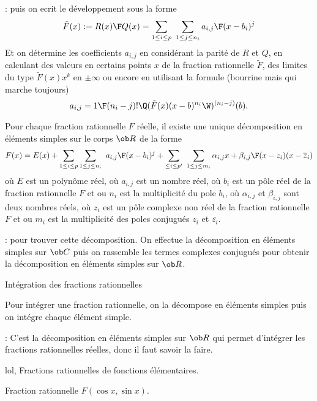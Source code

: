 \Remarque : puis on ecrit le développement sous la forme 
$$
\tilde F(x):={R(x)\F Q(x)}=\sum_{1\le i\le p}\ \sum_{1\le j\le n_i}{a_{i,j}\F (x-b_i)^j}
$$
Et on détermine les coefficients $a_{i,j}$ en considérant la parité de $R$ et $Q$, en calculant des valeurs en certains points $x$ de la fraction rationnelle $\tilde F$, des limites du type $\tilde F(x)x^k$ en $\pm\infty$ ou encore en utilisant la formule (bourrine mais qui marche toujours) 
$$
a_{i,j}={1\F (n_i-j)!}\Q(\tilde F(x)(x-b)^{n_i}\W)^{(n_i-j)}(b).
$$

\Propriete []  Pour chaque fraction rationnelle $F$ réelle, il existe une unique décomposition en éléments simples 
sur le corps $\ob R$ de la forme
$$
F(x)=E(x)+\sum_{1\le i\le p}\sum_{1\le j\le n_i}\ {a_{i,j}\F (x-b_i)^j}
+\sum_{\le i\le p'}\ \sum_{1\le j\le m_i}{\alpha_{i,j}x+\beta_{i,j}\F (x-z_i)(x-\overline z_i)}
$$
où $E$ est un polynôme réel, où $a_{i,j}$ est un nombre réel, où $b_i$ est un pôle réel de la fraction
rationnelle $F$ et ou $n_i$ est la multiplicité du pole $b_i$, où $\alpha_{i,j}$ et $\beta_{i,j}$ sont deux nombres réels, où $z_i$ est un pôle complexe non réel de la fraction
rationnelle $F$ et ou $m_i$ est la multiplicité des poles conjugués $z_i$ et $\overline{z_i}$.
\bigskip

\Remarque : pour trouver cette décomposition. On effectue la décomposition en éléments simples sur $\ob C$ puis on rassemble les termes complexes conjugués pour obtenir la décomposition 
en éléments simples sur $\ob R$. 
\bigskip

\Concept [Index=Primitives!des fractions rationnelles] Intégration des fractions rationnelles

Pour intégrer une fraction rationnelle, on la décompose en éléments simples puis on intégre chaque élément simple.
\medskip

\Remarque : C'est la décomposition en éléments simples sur $\ob R$ qui permet d'intégrer les fractions rationnelles réelles, donc il faut savoir la faire. 
\bigskip

\Subsection lol, Fractions rationnelles de fonctions élémentaires. 

\Concept [Index=Primitives!des fonctions du type@des fonctions du type $F(\cos x,\sin x)$] Fraction rationnelle $F(\cos x,\sin x)$. 

